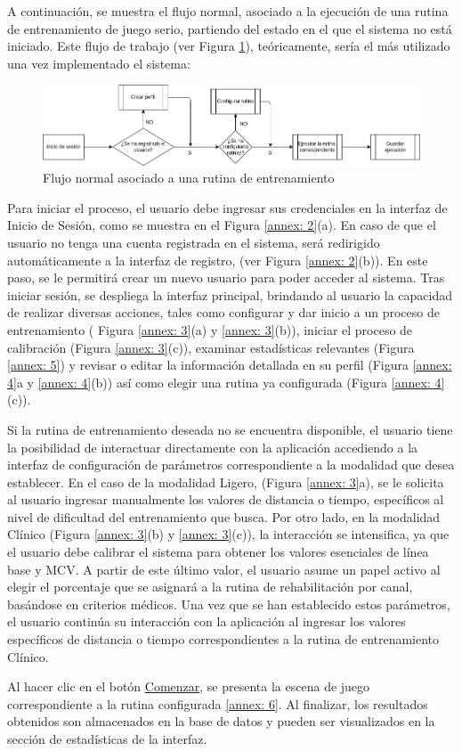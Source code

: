 A continuación, se muestra el flujo normal, asociado a la ejecución de una rutina de entrenamiento de juego serio, partiendo del estado en el que el sistema no está iniciado. Este flujo de trabajo (ver Figura \ref{fig: diagram-flow}), teóricamente, sería el más utilizado una vez implementado el sistema:

\begin{figure}[!ht]
    \centering
    \includegraphics[scale=0.5]{images/diagram-flow.png}
    \caption{Flujo normal asociado a una rutina de entrenamiento}
    \label{fig: diagram-flow}
\end{figure}

Para iniciar el proceso, el usuario debe ingresar sus credenciales en la interfaz de Inicio de Sesión, como se muestra en el Figura \ref{annex: 2}(a). En caso de que el usuario no tenga una cuenta registrada en el sistema, será redirigido automáticamente a la interfaz de registro, (ver Figura \ref{annex: 2}(b)). En este paso, se le permitirá crear un nuevo usuario para poder acceder al sistema. Tras iniciar sesión, se despliega la interfaz principal, brindando al usuario la capacidad de realizar diversas acciones, tales como configurar y dar inicio a un proceso de entrenamiento ( Figura \ref{annex: 3}(a) y \ref{annex: 3}(b)), iniciar el proceso de calibración (Figura \ref{annex: 3}(c)), examinar estadísticas relevantes (Figura \ref{annex: 5}) y revisar o editar la información detallada en su perfil (Figura \ref{annex: 4}a y \ref{annex: 4}(b)) así como elegir una rutina ya configurada (Figura \ref{annex: 4}(c)).

Si la rutina de entrenamiento deseada no se encuentra disponible, el usuario tiene la posibilidad de interactuar directamente con la aplicación accediendo a la interfaz de configuración de parámetros correspondiente a la modalidad que desea establecer. En el caso de la modalidad Ligero, (Figura \ref{annex: 3}a), se le solicita al usuario ingresar manualmente los valores de distancia o tiempo, específicos al nivel de dificultad del entrenamiento que busca. Por otro lado, en la modalidad Clínico (Figura \ref{annex: 3}(b) y \ref{annex: 3}(c)), la interacción se intensifica, ya que el usuario debe calibrar el sistema para obtener los valores esenciales de línea base y MCV. A partir de este último valor, el usuario asume un papel activo al elegir el porcentaje que se asignará a la rutina de rehabilitación por canal, basándose en criterios médicos. Una vez que se han establecido estos parámetros, el usuario continúa su interacción con la aplicación al ingresar los valores específicos de distancia o tiempo correspondientes a la rutina de entrenamiento Clínico.

Al hacer clic en el botón \underline{Comenzar}, se presenta la escena de juego correspondiente a la rutina configurada \ref{annex: 6}. Al finalizar, los resultados obtenidos son almacenados en la base de datos y pueden ser visualizados en la sección de estadísticas de la interfaz. 